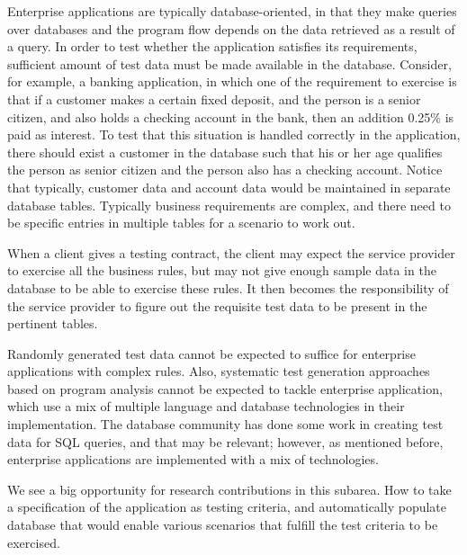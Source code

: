 
Enterprise applications are typically database-oriented, in that they make queries over databases and the program flow depends on the data retrieved as a result of a query.  In order to test whether the application satisfies its requirements, sufficient amount of test data must be made available in the database. Consider, for example, a banking application, in which one of the requirement to exercise is that if a customer makes a certain fixed deposit, and the person is a senior citizen, and also holds a checking account in the bank, then an addition 0.25\% is paid as interest. To test that this situation is handled correctly in the application, there should exist a customer in the database such that his or her age qualifies the person as senior citizen and the person also has a checking account. Notice that typically, customer data and account data would be maintained in separate database tables. Typically business requirements are complex, and there need to be specific entries in multiple tables for a scenario to work out.

When a client gives a testing contract, the client may expect the service provider to exercise all the business rules, but may not give enough sample data in the database to be able to exercise these rules.  It then becomes the responsibility of the service provider to figure out the requisite test data to be present in the pertinent tables.

Randomly generated test data  cannot be expected to suffice for enterprise applications with complex rules. Also, systematic test generation approaches based on program analysis cannot be expected to tackle enterprise application, which use a mix of multiple language and database technologies in their implementation. The database community has done some work in creating test data for SQL queries, and that may be relevant; however, as mentioned before, enterprise applications are implemented with a mix of technologies.

We see a big opportunity for research contributions in this subarea. How to take a specification of the application as testing criteria, and automatically populate database that would enable various scenarios that fulfill the test criteria to be exercised.
